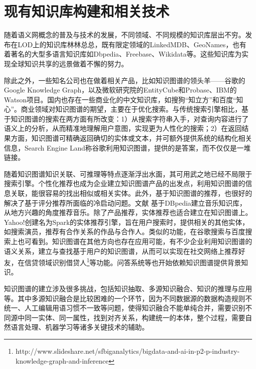 \section{现有知识库构建和相关技术}
\label{sec:knowledgebase-research}

随着语义网概念的普及与技术的发展，不同领域、不同规模的知识库层出不穷。发布在LOD上的知识库林林总总，既有限定领域的LinkedMDB\cite{erxleben2014introducing}、GeoNames\cite{wick2011geonames}，也有着著名的大型多语言知识库如Dbpedia、Freebase、Wikidata等。这些知识库为实现全球知识共享的远景做着不懈的努力。

除此之外，一些知名公司也在做着相关产品，比如知识图谱的领头羊——谷歌的Google Knowledge Graph\cite{singhal2012introducing}，以及微软研究院的EntityCube\cite{nie2012statistical}和Probase\cite{wu2012probase}、IBM的Watson项目\cite{ferrucci2012introduction}。国内也存在一些商业化的中文知识库，如搜狗“知立方”和百度“知心”。商业领域对知识图谱的期望，主要在于优化搜索。与传统搜索引擎相比，基于知识图谱的搜索在两方面有所改变：1）从搜索字符串入手，对查询内容进行了语义上的分析，从而精准地理解用户意图，实现更为人性化的搜索；2）在返回结果方面，知识图谱可精确返回确切的实体或文本，并可额外提供系统的结构化相关信息，Search Engine Land称谷歌利用知识图谱，提供的是答案，而不仅仅是一堆链接\cite{sullivan2012google}。

随着知识图谱知识关联、可推理等特点逐渐浮出水面，其可用武之地已经不局限于搜索引擎。个性化推荐也成为企业建立知识图谱产品的出发点\cite{Burke00knowledge-basedrecommender,aggarwal2016knowledge}，利用知识图谱的信息关联，能很容易的找出相似或相关实体。此外，基于知识图谱的推荐，也很好的解决了基于评分推荐所面临的冷启动问题。文献\cite{passant2010dbrec,kaminskas2012knowledge} 基于DBpedia建立音乐知识库，从地方兴趣的角度推荐音乐。除了产品推荐，实体推荐也适合建立在知识图谱上。Yahoo!创建名为Spark的实体推荐引擎\cite{blanco2013entity}，旨在用户搜索时，提供相关的其他实体，如搜索演员，推荐有合作关系的作品与合作人。类似的功能，在谷歌搜索与百度搜索上也可看到。知识图谱在其他方向也存在应用可能，有不少企业利用知识图谱的语义关系，建立与查找基于用户的知识图谱，从而可以实现在社交网络上推荐好友\cite{venkataramani2012tao}，在信贷领域识别借贷人\footnote{http://www.slideshare.net/sfbiganalytics/bigdata-and-ai-in-p2-p-industry-knowledge-graph-and-inference}等功能。问答系统等也开始依赖知识图谱提供背景知识\cite{yih2015semantic,yang2014joint}。

知识图谱的建立涉及很多挑战，包括知识抽取、多源知识融合、知识的推理与应用等。其中多源知识融合是比较困难的一个环节，因为不同数据源的数据构造规则不统一、人工编辑用语习惯不一致等问题，使得知识融合不能单纯合并，需要识别不同源中同一实体、同一属性，找到对齐关系，构建统一的本体，整个过程，需要自然语言处理、机器学习等诸多关键技术的辅助。

